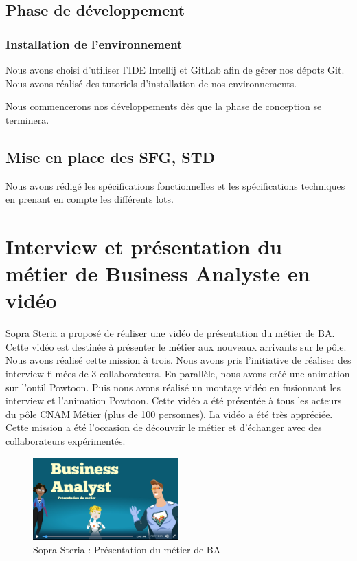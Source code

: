 \subsection{Phase de développement}

\subsubsection{Installation de l’environnement}
Nous avons choisi d'utiliser l'IDE Intellij et GitLab afin de gérer nos dépots Git. Nous avons réalisé des tutoriels d'installation de nos environnements.

Nous commencerons nos développements dès que la phase de conception se terminera.

\subsection{Mise en place des SFG, STD}

Nous avons rédigé les spécifications fonctionnelles et les spécifications techniques en prenant en compte les différents lots. 

\section{Interview et présentation du métier de Business Analyste en vidéo}

Sopra Steria a proposé de réaliser une vidéo de présentation du métier de BA. Cette vidéo est destinée à présenter le métier aux nouveaux arrivants sur le pôle. Nous avons réalisé cette mission à trois. Nous avons pris l'initiative de réaliser des interview filmées de 3 collaborateurs. En parallèle, nous avons créé une animation sur l'outil Powtoon. Puis nous avons réalisé un montage vidéo en fusionnant les interview et l'animation Powtoon. Cette vidéo a été présentée à tous les acteurs du pôle CNAM Métier (plus de 100 personnes). La vidéo a été très appréciée. Cette mission a été l'occasion de découvrir le métier et d'échanger avec des collaborateurs expérimentés.

\begin{figure}[H]
\centering
\includegraphics[width=0.5\textwidth]{images/presBA.png}
\caption{Sopra Steria : Présentation du métier de BA}
\end{figure}

